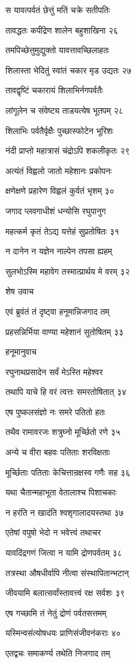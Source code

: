 स यावत्पर्वतं छेत्तुं मतिं चक्रे सतीपतिः

तावद्धतः कपींद्रेण शालेन बहुशाखिना २६

तमपिच्छेत्तुमुद्युक्तो यावत्तावच्छिलाहतः

शिलास्ता भेदितुं स्वांतं चकार मृड उद्यतः २७

तावद्वृष्टिं चकारायं शिलाभिर्नगपर्वतैः

लांगूलेन च संवेष्ट्य ताडयत्येष भूतपम् २८

शिलाभिः पर्वतैर्वृक्षैः पुच्छास्फोटेन भूरिशः

नंदी प्राप्तो महात्रासं चंद्रोऽपि शकलीकृतः २९

अत्यंतं विह्वलो जातो महेशानः प्रकोपनः

क्षणेक्षणे प्रहारेण विह्वलं कुर्वतं भृशम् ३०

जगाद प्लवगाधीशं धन्योसि रघुपानुग

महत्कर्म कृतं तेऽद्य यत्तेहं सुप्रतोषितः ३१

न दानेन न यज्ञेन नाल्पेन तपसा ह्यहम्

सुलभोऽस्मि महावेग तस्मात्प्रार्थय मे वरम् ३२

शेष उवाच

एवं ब्रुवंतं तं दृष्ट्वा हनूमान्निजगाद तम्

प्रहसन्निर्भिया वाण्या महेशानं सुतोषितम् ३३

हनूमानुवाच

रघुनाथप्रसादेन सर्वं मेऽस्ति महेश्वर

तथापि याचे हि वरं त्वत्तः समरतोषितात् ३४

एष पुष्कलसंज्ञो नः समरे पतितो हतः

तथैव रामावरजः शत्रुघ्नो मूर्च्छितो रणे ३५

अन्ये च वीरा बहवः पतिताः शरविक्षताः

मूर्च्छिताः पतिताः केचित्तान्रक्षस्व गणैः सह ३६

यथा चैतान्महाभूता वेतालाश्च पिशाचकाः

न हरंति न खादंति श्वशृगालादयस्तथा ३७

एतेषां वपुषो भेदो न भवेत्त्वं तथाचर

यावदिंद्रगणं जित्वा न यामि द्रोणपर्वतम् ३८

तत्रस्था औषधीर्वापि नीत्वा संस्थापितान्भटान्

जीवयामि बलात्सर्वांस्तावत्त्वं रक्ष सर्वशः ३९

एष गच्छामि तं नेतुं द्रोणं पर्वतसत्तमम्

यस्मिन्वसंत्योषधयः प्राणिसंजीवनंकराः ४०

एतद्वचः समाकर्ण्य तथेति निजगाद तम्

